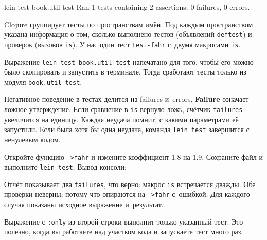 \begin{english}
  \begin{text}
lein test book.util-test
Ran 1 tests containing 2 assertions.
0 failures, 0 errors.
  \end{text}
\end{english}

Clojure группирует тесты по пространствам имён. Под каждым пространством указана
информация о том, сколько выполнено тестов (объявлений \verb|deftest|) и
проверок (вызовов \verb|is|). У нас один тест \verb|test-fahr| с~двумя макросами
\verb|is|.


Выражение \verb|lein test book.util-test| напечатано для того, чтобы его можно
было скопировать и запустить в терминале. Тогда сработают тесты только из модуля
\verb|book.util-test|.

Негативное поведение в тестах делится на failures
и~errors. \textbf{Failure}  означает ложное утверждение. Если
сравнение в \verb|is| вернуло ложь, счётчик \verb|failures| увеличится на
единицу. Каждая неудача помнит, с какими параметрами её запустили. Если была
хотя бы одна неудача, команда \verb|lein test| завершится с ненулевым кодом.

Откройте функцию \verb|->fahr| и измените коэффициент 1.8 на 1.9. Сохраните файл
и выполните \verb|lein test|. Вывод консоли:

\begin{english}
\end{english}

Отчёт показывает два \verb|failures|, что верно: макрос \verb|is| встречается
дважды. Обе проверки неверны, потому что опираются на \verb|->fahr|
с~ошибкой. Для каждого случая показаны исходное выражение и~результат.

Выражение с \verb|:only| из второй строки выполнит только указанный тест. Это
полезно, когда вы работаете над участком кода и запускаете тест много раз.

